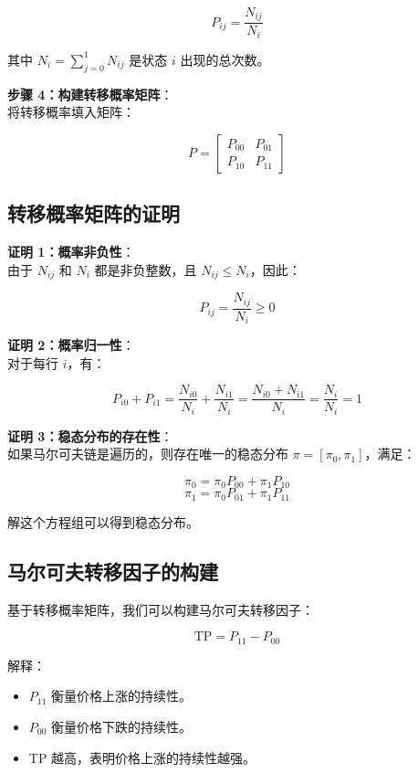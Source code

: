 \documentclass[a4paper]{article}
\begin{document}
\[
P_{ij} = \frac{N_{ij}}{N_i}
\]

其中 \( N_i = \sum_{j=0}^{1} N_{ij} \) 是状态 \( i \) 出现的总次数。

\noindent \textbf{步骤 4：构建转移概率矩阵}： \\
将转移概率填入矩阵：

\[
P = \begin{bmatrix}
P_{00} & P_{01} \\
P_{10} & P_{11}
\end{bmatrix}
\]

\subsection*{转移概率矩阵的证明}

\noindent \textbf{证明 1：概率非负性}： \\
由于 \( N_{ij} \) 和 \( N_i \) 都是非负整数，且 \( N_{ij} \leq N_i \)，因此：

\[
P_{ij} = \frac{N_{ij}}{N_i} \geq 0
\]

\noindent \textbf{证明 2：概率归一性}： \\
对于每行 \( i \)，有：

\[
P_{i0} + P_{i1} = \frac{N_{i0}}{N_i} + \frac{N_{i1}}{N_i} = \frac{N_{i0} + N_{i1}}{N_i} = \frac{N_i}{N_i} = 1
\]

\noindent \textbf{证明 3：稳态分布的存在性}： \\
如果马尔可夫链是遍历的，则存在唯一的稳态分布 \( \pi = [\pi_0, \pi_1] \)，满足：

\[
\pi_0 = \pi_0 P_{00} + \pi_1 P_{10}
\]
\[
\pi_1 = \pi_0 P_{01} + \pi_1 P_{11}
\]

解这个方程组可以得到稳态分布。

\subsection*{马尔可夫转移因子的构建}

基于转移概率矩阵，我们可以构建马尔可夫转移因子：

\[
\text{TP} = P_{11} - P_{00}
\]

解释：\cite*{deepseek}
\begin{itemize}
    \item \( P_{11} \) 衡量价格上涨的持续性。
    \item \( P_{00} \) 衡量价格下跌的持续性。
    \item TP 越高，表明价格上涨的持续性越强。
\end{itemize} 
\end{document}
